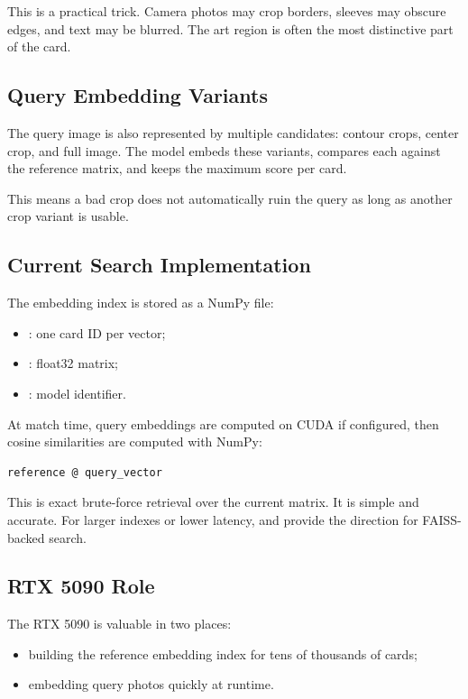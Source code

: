 \documentclass[11pt,a4paper]{article}
\begin{document}
This is a practical trick. Camera photos may crop borders, sleeves may obscure edges, and text may be blurred. The art region is often the most distinctive part of the card.

\subsection{Query Embedding Variants}

The query image is also represented by multiple candidates: contour crops, center crop, and full image. The model embeds these variants, compares each against the reference matrix, and keeps the maximum score per card.

This means a bad crop does not automatically ruin the query as long as another crop variant is usable.

\subsection{Current Search Implementation}

The embedding index is stored as a NumPy  file:

\begin{itemize}
  \item {}: one card ID per vector;
  \item {}: float32 matrix;
  \item {}: model identifier.
\end{itemize}

At match time, query embeddings are computed on CUDA if configured, then cosine similarities are computed with NumPy:

\begin{lstlisting}
reference @ query_vector
\end{lstlisting}

This is exact brute-force retrieval over the current matrix. It is simple and accurate. For larger indexes or lower latency,  and  provide the direction for FAISS-backed search.

\subsection{RTX 5090 Role}

The RTX 5090 is valuable in two places:

\begin{itemize}
  \item building the reference embedding index for tens of thousands of cards;
  \item embedding query photos quickly at runtime.
\end{itemize}
\end{document}
